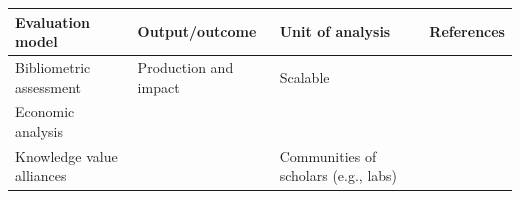 \documentclass[]{elsarticle} %
\begin{document}
\begin{longtable}[]{@{}llll@{}}
\toprule
\begin{minipage}[b]{0.24\columnwidth}\raggedright
Evaluation model\strut
\end{minipage} & \begin{minipage}[b]{0.23\columnwidth}\raggedright
Output/outcome\strut
\end{minipage} & \begin{minipage}[b]{0.25\columnwidth}\raggedright
Unit of analysis\strut
\end{minipage} & \begin{minipage}[b]{0.16\columnwidth}\raggedright
References\strut
\end{minipage}\tabularnewline
\midrule
\endhead
\begin{minipage}[t]{0.24\columnwidth}\raggedright
Bibliometric assessment\strut
\end{minipage} & \begin{minipage}[t]{0.23\columnwidth}\raggedright
Production and impact\strut
\end{minipage} & \begin{minipage}[t]{0.25\columnwidth}\raggedright
Scalable\strut
\end{minipage} & \begin{minipage}[t]{0.16\columnwidth}\raggedright
\strut
\end{minipage}\tabularnewline
\begin{minipage}[t]{0.24\columnwidth}\raggedright
Economic analysis\strut
\end{minipage} & \begin{minipage}[t]{0.23\columnwidth}\raggedright
\strut
\end{minipage} & \begin{minipage}[t]{0.25\columnwidth}\raggedright
\strut
\end{minipage} & \begin{minipage}[t]{0.16\columnwidth}\raggedright
\strut
\end{minipage}\tabularnewline
\begin{minipage}[t]{0.24\columnwidth}\raggedright
Knowledge value alliances\strut
\end{minipage} & \begin{minipage}[t]{0.23\columnwidth}\raggedright
\strut
\end{minipage} & \begin{minipage}[t]{0.25\columnwidth}\raggedright
Communities of scholars (e.g., labs)\strut
\end{minipage} & \begin{minipage}[t]{0.16\columnwidth}\raggedright

\end{minipage}
\end{longtable}
\end{document}
